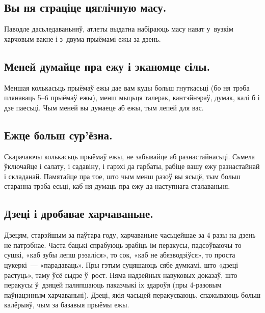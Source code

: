 \subsection{Вы ня страціце цяглічную масу.}
Паводле дасьледаваньняў, атлеты выдатна набіраюць масу нават у~вузкім харчовым вакне і з~двума прыёмамі ежы за дзень.

\subsection{Меней думайце пра ежу і эканомце сілы.}
Меншая колькасьць прыёмаў ежы дае вам куды больш гнуткасьці (бо ня трэба плянаваць 5--6 прыёмаў ежы), менш мыцьця талерак, кантэйнэраў, думак, калі б і дзе паесьці. Чым меней вы думаеце аб ежы, тым лепей для вас.

\subsection{Ежце больш сур'ёзна.}
Скарачаючы колькасьць прыёмаў ежы, не забывайце аб разнастайнасьці. Сьмела ўключайце і салату, і садавіну, і гарэхі да гарбаты, рабіце вашу ежу разнастайнай і складанай. Памятайце пра тое, што чым менш разоў вы ясьцё, тым больш старанна трэба есьці, каб ня думаць пра ежу да наступнага сталаваньня.

\subsection{Дзеці і дробавае харчаваньне.}
Дзецям, старэйшым за паўтара году, харчаваньне часьцейшае за 4 разы на дзень не патрэбнае. Часта бацькі спрабуюць зрабіць ім перакусы, падсоўваючы то сушкі, «каб зубы лепш рэзаліся», то сок, «каб не абязводзіўся», то проста цукеркі~--- «парадаваць». Пры гэтым суцяшаюць сябе думкамі, што «дзеці растуць», таму ўсё сыдзе ў~рост. Няма надзейных навуковых доказаў, што перакусы ў~дзяцей паляпшаюць паказчыкі іх здароўя (пры 4-разовым паўнацэнным харчаваньні). Дзеці, якія часьцей  перакусваюць, спажываюць больш калёрыяў, чым за базавыя прыёмы ежы.